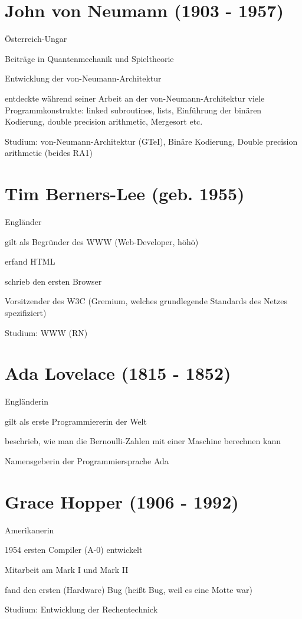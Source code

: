 \documentclass[a4paper,12pt]{report}
\begin{document}
\section{John von Neumann (1903 - 1957)}
\begin{itemize*}
	\item Österreich-Ungar
	\item Beiträge in Quantenmechanik und Spieltheorie
	\item Entwicklung der von-Neumann-Architektur
	\item entdeckte während seiner Arbeit an der von-Neumann-Architektur viele Programmkonstrukte: linked subroutines, lists, Einführung der binären Kodierung, double precision arithmetic, Mergesort etc.
	\item Studium: von-Neumann-Architektur (GTeI), Binäre Kodierung, Double precision arithmetic (beides RA1)
\end{itemize*}

\section{Tim Berners-Lee (geb. 1955)}
\begin{itemize*}
	\item Engländer
	\item gilt als Begründer des WWW (Web-Developer, höhö)
	\item erfand HTML
	\item schrieb den ersten Browser
	\item Vorsitzender des W3C (Gremium, welches grundlegende Standards des Netzes spezifiziert)
	\item Studium: WWW (RN)
\end{itemize*}

\section{Ada Lovelace (1815 - 1852)}
\begin{itemize*}
	\item Engländerin
	\item gilt als erste Programmiererin der Welt
	\item beschrieb, wie man die Bernoulli-Zahlen mit einer Maschine berechnen kann
	\item Namensgeberin der Programmiersprache Ada
\end{itemize*}

\section{Grace Hopper (1906 - 1992)}
\begin{itemize*}
	\item Amerikanerin
	\item 1954 ersten Compiler (A-0) entwickelt
	\item Mitarbeit am Mark I und Mark II
	\item fand den ersten (Hardware) Bug (heißt Bug, weil es eine Motte war)
	\item Studium: Entwicklung der Rechentechnick
\end{itemize*}
\end{document}
